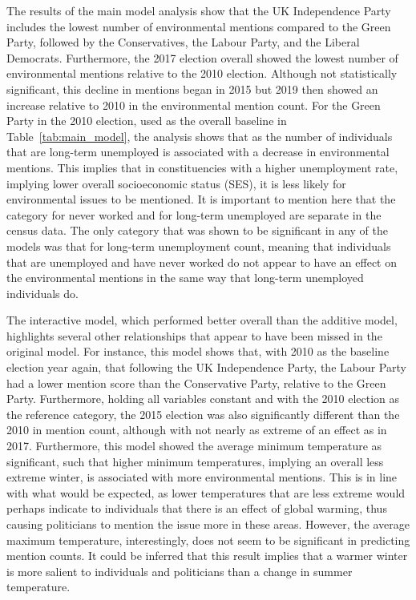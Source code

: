 \documentclass[12pt,letterpaper]{article}
\begin{document}
The results of the main model analysis show that the UK Independence Party includes the lowest number of environmental mentions compared to the Green Party, followed by the Conservatives, the Labour Party, and the Liberal Democrats. Furthermore, the 2017 election overall showed the lowest number of environmental mentions relative to the 2010 election. Although not statistically significant, this decline in mentions began in 2015 but 2019 then showed an increase relative to 2010 in the environmental mention count. For the Green Party in the 2010 election, used as the overall baseline in Table~\ref{tab:main_model}, the analysis shows that as the number of individuals that are long-term unemployed is associated with a decrease in environmental mentions. This implies that in constituencies with a higher unemployment rate, implying lower overall socioeconomic status (SES), it is less likely for environmental issues to be mentioned. It is important to mention here that the category for never worked and for long-term unemployed are separate in the census data. The only category that was shown to be significant in any of the models was that for long-term unemployment count, meaning that individuals that are unemployed and have never worked do not appear to have an effect on the environmental mentions in the same way that long-term unemployed individuals do.


The interactive model, which performed better overall than the additive model, highlights several other relationships that appear to have been missed in the original model. For instance, this model shows that, with 2010 as the baseline election year again, that following the UK Independence Party, the Labour Party had a lower mention score than the Conservative Party, relative to the Green Party. Furthermore, holding all variables constant and with the 2010 election as the reference category, the 2015 election was also significantly different than the 2010 in mention count, although with not nearly as extreme of an effect as in 2017. Furthermore, this model showed the average minimum temperature as significant, such that higher minimum temperatures, implying an overall less extreme winter, is associated with more environmental mentions. This is in line with what would be expected, as lower temperatures that are less extreme would perhaps indicate to individuals that there is an effect of global warming, thus causing politicians to mention the issue more in these areas. However, the average maximum temperature, interestingly, does not seem to be significant in predicting mention counts. It could be inferred that this result implies that a warmer winter is more salient to individuals and politicians than a change in summer temperature.
\end{document}
